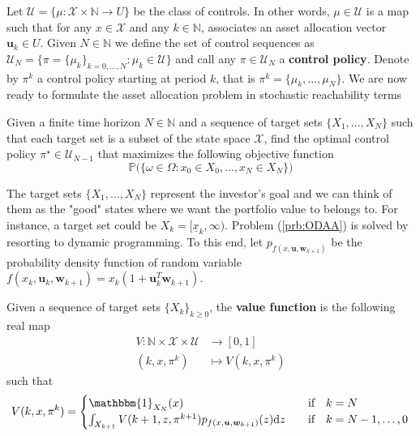 Let $\mathcal{U} = \big\{ \mu : \mathcal{X} \times \mathbb{N} \rightarrow U \big\}$ be the class of controls. In other words, $\mu \in \mathcal{U}$ is a map such that for any $x \in \mathcal{X}$ and any $k \in \mathbb{N}$, associates an asset allocation vector $\bm{u}_k \in U$.
Given $N \in \mathbb{N}$ we define the set of control sequences as $\mathcal{U}_N = \big\{\pi = \{\mu_k\}_{k=0,\ldots,N}  : \mu_k \in \mathcal{U} \big\}$ and call any $\pi \in \mathcal{U}_N$ a \textbf{control policy}. Denote by $\pi^k$ a control policy starting at period $k$, that is $\pi^k=\{\mu_k,\ldots,\mu_N\}$. We are now ready to formulate the asset allocation problem in stochastic reachability terms
\begin{problem}\label{prb:ODAA}
Given a finite time horizon $N \in \mathbb{N}$ and a sequence of target sets $\{X_1,\ldots,X_N \} $ such that each target set is a subset of the state space $\mathcal{X}$, find the optimal control policy $\pi^{\star} \in \mathcal{U}_{N-1}$ that maximizes the following objective function 
\begin{equation}\label{eq:obj_fun_ODAA}
\mathbb{P}\big(\{\omega \in \Omega : x_0 \in X_0,\ldots,x_N \in X_N \} \big)
\end{equation}
\end{problem}
The target sets $\{X_1,\ldots,X_N \}$ represent the investor's goal and we can think of them as the "good" states where we want the portfolio value to belongs to. For instance, a target set could be $X_k = [\underline{x}_k,\infty)$. Problem (\ref{prb:ODAA}) is solved by resorting to dynamic programming. To this end, let $p_{f(x,\bm{u},\bm{w}_{k+1})}$ be the probability density function of random variable $f(x_k,\bm{u}_k,\bm{w}_{k+1}) = x_k (1 + \bm{u}_k^T \bm{w}_{k+1})$.
\begin{definition}
	Given a sequence of target sets $\{X_k\}_{k\geq0}$, the \textbf{value function} is the following real map
	\begin{align*}
	V \colon \mathbb{N}\times \mathcal{X}\times \mathcal{U} & \rightarrow [0,1]\\
	(k,x,\pi^k) & \mapsto V(k,x,\pi^k)
	\end{align*}
	such that 
	\[V(k,x,\pi^k)=
	\begin{cases}
	    \mathbbm{1}_{X_N}(x) & \quad \text{if} \quad k = N \\
	    \int_{X_{k+1}}V(k+1,z,\pi^{k+1})p_{f(x,\bm{u},\bm{w}_{k+1})}(z)\mathrm{d}z & \quad \text{if} \quad k = N-1,\ldots,0
	\end{cases}
	\]
	\end{definition}

